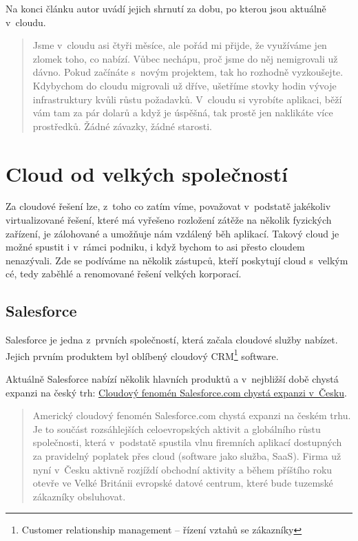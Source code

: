 Na konci článku autor uvádí jejich shrnutí za dobu, po kterou jsou aktuálně v~cloudu.
\begin{quote}
Jsme v~cloudu asi čtyři měsíce, ale pořád mi přijde, že využíváme jen zlomek toho, co nabízí. Vůbec nechápu, proč jsme do něj nemigrovali už dávno. Pokud začínáte s~novým projektem, tak ho rozhodně vyzkoušejte. Kdybychom do cloudu migrovali už dříve, ušetříme stovky hodin vývoje infrastruktury kvůli růstu požadavků. V~cloudu si vyrobíte aplikaci, běží vám tam za pár dolarů a když je úspěšná, tak prostě jen naklikáte více prostředků. Žádné závazky, žádné starosti.\cite{souki:procMigrovat}
\end{quote}

\newpage
\section{Cloud od velkých společností}
Za cloudové řešení lze, z~toho co zatím víme, považovat v~podstatě jakékoliv virtualizované řešení, které má vyřešeno rozložení zátěže na několik fyzických zařízení, je zálohované a umožňuje nám vzdálený běh aplikací. Takový cloud je možné spustit i v~rámci podniku, i když bychom to asi přesto cloudem nenazývali. Zde se podíváme na několik zástupců, kteří poskytují cloud s~velkým cé, tedy zaběhlé a renomované řešení velkých korporací.

\subsection{Salesforce}
Salesforce je jedna z~prvních společností, která začala cloudové služby nabízet. Jejich prvním produktem byl oblíbený cloudový CRM\footnote{Customer relationship management -- řízení vztahů se zákazníky} software.

Aktuálně Salesforce nabízí několik hlavních produktů a v~nejbližší době chystá expanzi na český trh: \href{http://connect.zive.cz/clanky/cloudovy-fenomen-salesforcecom-chysta-expanzi-v-cesku/sc-320-a-171592/default.aspx}{Cloudový fenomén Salesforce.com chystá expanzi v~Česku\cite{zive:salesforceExpanze}}.

\begin{quote}
Americký cloudový fenomén Salesforce.com chystá expanzi na českém trhu. Je to součást rozsáhlejších celoevropských aktivit a globálního růstu společnosti, která v~podstatě spustila vlnu firemních aplikací dostupných za pravidelný poplatek přes cloud (software jako služba, SaaS). Firma už nyní v~Česku aktivně rozjíždí obchodní aktivity a během příštího roku otevře ve Velké Británii evropské datové centrum, které bude tuzemské zákazníky obsluhovat.\cite{zive:salesforceExpanze}
\end{quote}

